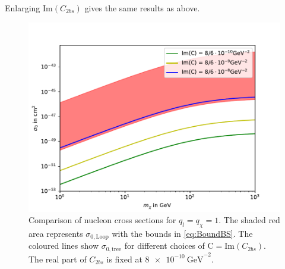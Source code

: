 Enlarging $\text{Im}(C_{2bs})$ gives the same results as above.
\begin{figure}
	\centering
	\includegraphics[scale=.8]{content/graphics/Im116.pdf}
	\caption{Comparison of nucleon cross sections for $q_l=q_\chi=1$. The shaded red area represents $\sigma_{0,\text{Loop}}$ with the bounds in \eqref{eq:BoundBS}. The coloured lines show $\sigma_{0,\text{tree}}$ for different choices of $\text{C} = \text{Im}(C_{2bs})$. The real part of $C_{2bs}$ is fixed at $\SI{8e-10}{\giga\electronvolt}^{-2}$.}
	\label{fig:HighIm116}
\end{figure}